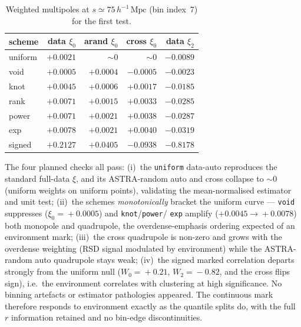 \documentclass[11pt]{article}
\newcommand{\Mpch}{\,h^{-1}\,\mathrm{Mpc}}
\newcommand{\code}[1]{\texttt{#1}}
\newcommand{\xifull}{\xi}
\begin{document}
\begin{table}[h]\centering
\begin{tabular}{lrrrr}
\hline
scheme & data $\xi_0$ & arand $\xi_0$ & cross $\xi_0$ & data $\xi_2$ \\
\hline
uniform & $+0.0021$ & $\sim0$ & $\sim0$ & $-0.0089$ \\
void    & $+0.0005$ & $+0.0004$ & $-0.0005$ & $-0.0023$ \\
knot    & $+0.0045$ & $+0.0006$ & $+0.0017$ & $-0.0185$ \\
rank    & $+0.0071$ & $+0.0015$ & $+0.0033$ & $-0.0285$ \\
power   & $+0.0071$ & $+0.0021$ & $+0.0038$ & $-0.0287$ \\
exp     & $+0.0078$ & $+0.0021$ & $+0.0040$ & $-0.0319$ \\
signed  & $+0.2127$ & $+0.0405$ & $-0.0938$ & $-0.8178$ \\
\hline
\end{tabular}
\caption{Weighted multipoles at $s\simeq75\Mpch$ (bin index~7) for the first test.}
\label{tab:firsttest}
\end{table}

The four planned checks all pass: (i)~the \code{uniform} data-auto reproduces the
standard full-data $\xifull$, and its ASTRA-random auto and cross collapse to
$\sim0$ (uniform weights on uniform points), validating the mean-normalised
estimator and unit test; (ii)~the schemes \emph{monotonically} bracket the uniform
curve --- \code{void} suppresses ($\xi_0\!=\!+0.0005$) and \code{knot}/\code{power}/
\code{exp} amplify ($+0.0045\!\to\!+0.0078$) both monopole and quadrupole, the
overdense-emphasis ordering expected of an environment mark; (iii)~the cross
quadrupole is non-zero and grows with the overdense weighting (RSD signal modulated
by environment) while the ASTRA-random auto quadrupole stays weak; (iv)~the signed
marked correlation departs strongly from the uniform null ($W_0\!=\!+0.21$,
$W_2\!=\!-0.82$, and the cross flips sign), i.e.\ the environment correlates with
clustering at high significance. No binning artefacts or estimator pathologies
appeared. The continuous mark therefore responds to environment exactly as the
quantile splits do, with the full $r$ information retained and no bin-edge
discontinuities.
\end{document}
